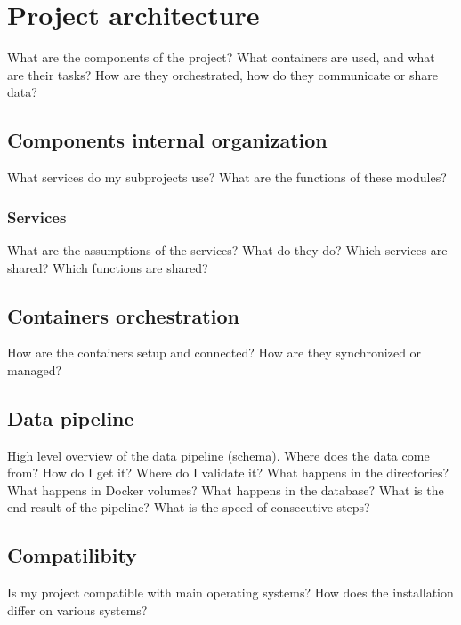 \chapter{Project architecture}
\label{ch:architecture}
What are the components of the project?
What containers are used, and what are their tasks?
How are they orchestrated, how do they communicate or share data?


\section{Components internal organization}
What services do my subprojects use?
What are the functions of these modules?

\subsection{Services}
What are the assumptions of the services? What do they do?
Which services are shared? Which functions are shared?


\section{Containers orchestration}
How are the containers setup and connected?
How are they synchronized or managed?


\section{Data pipeline}
High level overview of the data pipeline (schema).
Where does the data come from? How do I get it?
Where do I validate it? What happens in the directories?
What happens in Docker volumes? What happens in the database?
What is the end result of the pipeline?
What is the speed of consecutive steps?


\section{Compatilibity}
Is my project compatible with main operating systems?
How does the installation differ on various systems?

